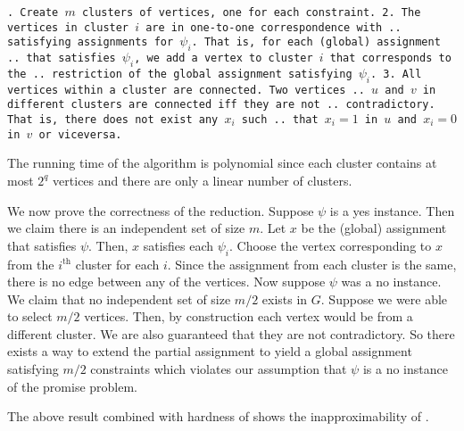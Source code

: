 \medskip
{\tt \obeylines {}. Create $m$ clusters of vertices, one for each constraint. 
2. The vertices in cluster $i$ are in one-to-one correspondence with
.. satisfying assignments for $\psi_{i}$. That is, for each (global) assignment 
.. that satisfies $\psi_{i}$, we add a vertex to cluster $i$ that corresponds to the 
.. restriction of the global assignment satisfying $\psi_{i}$.
3. All vertices within a cluster are connected. Two vertices 
.. $u$ and $v$ in different clusters are connected iff they are not 
.. contradictory. That is, there does not exist any $x_i$ such 
.. that $x_i = 1$ in $u$ and $x_i = 0$ in $v$ or viceversa.
}
\medskip

The running time of the algorithm is polynomial since each cluster contains at most 
$2^q$ vertices and there are only a linear number of clusters.

We now prove the correctness of the reduction. Suppose $\psi$ is a yes instance. 
Then we claim there is an independent set of size $m$. Let $x$ be the (global) assignment 
that satisfies $\psi$. Then, $x$ satisfies each $\psi_{i}$. Choose the vertex 
corresponding to $x$ from the $i^\textrm{th}$ cluster for each $i$. Since the assignment from 
each cluster is the same, there is no edge between any of the vertices. Now suppose $\psi$ was a 
no instance. We claim that no independent set of size $m/2$ exists in $G$. Suppose we were able to 
select $m/2$ vertices. Then, by construction each vertex would be from a different cluster. We are 
also guaranteed that they are not contradictory. So there exists a way to extend the partial 
assignment to yield a global assignment satisfying $m/2$ constraints which violates our assumption 
that $\psi$ is a no instance of the promise problem.

The above result combined with hardness of  shows the inapproximability of .

